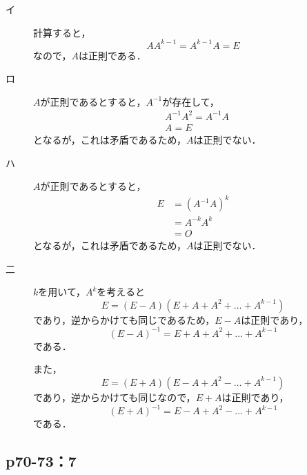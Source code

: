\documentclass[uplatex,dvipdfmx,a4paper,10pt,fleqn]{jsarticle}
\begin{document}
    \begin{leftbar}
        \begin{description}
            \item[イ] 計算すると，
            \[
                A A^{k-1} = A^{k-1} A = E
            \]
            なので，$A$は正則である．
            \item[ロ] $A$が正則であるとすると，$A^{-1}$が存在して，
            \begin{align*}
                & A^{-1} A^{2} = A^{-1} A \\
                & A = E 
            \end{align*} 
            となるが，これは矛盾であるため，$A$は正則でない．
            \item[ハ] $A$が正則であるとすると，
            \begin{align*} 
                E & = (A^{-1} A)^{k} \\
                & = A^{-k} A^{k} \\
                & = O 
            \end{align*} 
            となるが，これは矛盾であるため，$A$は正則でない．
            \item[二] $k$を用いて，$A^k$を考えると
            \[
                E = (E-A)(E+A+A^2+\dots+A^{k-1})
            \]
            であり，逆からかけても同じであるため，$E-A$は正則であり，
            \[
                (E-A)^{-1}=E+A+A^2+\dots+A^{k-1}
            \]
            である．

            また，
            \[
                E=(E+A)(E-A+A^2-\dots+A^{k-1})
            \]
            であり，逆からかけても同じなので，$E+A$は正則であり，
            \[
                (E+A)^{-1} = E-A+A^2-\dots+A^{k-1}
            \]
            である．
        \end{description}
    \end{leftbar}

    \newpage 

\subsection*{p70-73：7}
\end{document}
